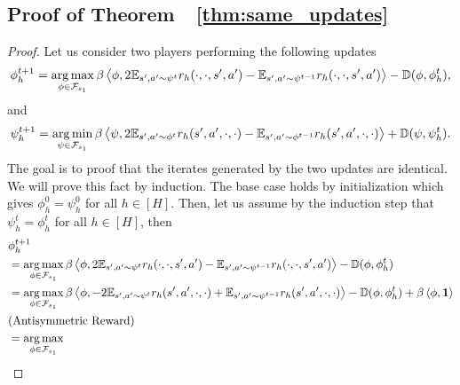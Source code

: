 \subsection{Proof of Theorem~~\ref{thm:same_updates}}
\label{proof:same_updates}
\begin{proof}
Let us consider two players performing the following updates
\begin{align*}
            \phi_h^{t+1} = \operatorname*{arg\,max}_{\phi \in \mathcal{F}_{s_1}} 
            \beta \left\langle{\phi},{
            2 \mathbb{E}_{s',a' \sim \psi^t}r_h(\cdot,\cdot,s',a') - \mathbb{E}_{s',a' \sim \psi^{t-1}}r_h(\cdot,\cdot,s',a')}\right\rangle - \mathbb{D}(\phi, \phi_h^t),
        \end{align*}
        and
        \begin{align*}
            \psi_h^{t+1} = \operatorname*{arg\,min}_{\psi \in \mathcal{F}_{s_1}} 
            \beta \left\langle{\psi},{
            2 \mathbb{E}_{s',a' \sim \phi^t}r_h(s',a',\cdot,\cdot) - \mathbb{E}_{s',a' \sim \phi^{t-1}}r_h(s',a',\cdot,\cdot)}\right\rangle + \mathbb{D}(\psi, \psi_h^t).
        \end{align*}
        The goal is to proof that the iterates generated by the two updates are identical. We will prove this fact by induction. The base case holds by initialization which gives $\phi_h^0=\psi^0_h$ for all $h \in [H]$.
        Then, let us assume by the induction step that $\psi^t_h = \phi^t_h$ for all $h \in [H]$, then 
        \begin{align*}
           & \phi_h^{t+1} \\&= \argmax_{\phi \in \mathcal{F}_{s_1}} 
            \beta \innerprod{\phi}{
            2 \mathbb{E}_{s',a' \sim \psi^t}r_h(\cdot,\cdot,s',a') - \mathbb{E}_{s',a' \sim \psi^{t-1}}r_h(\cdot,\cdot, s',a')} - \mathbb{D}(\phi, \phi_h^t) \\
            &= \argmax_{\phi \in \mathcal{F}_{s_1}} 
            \beta \innerprod{\phi}{
            - 2 \mathbb{E}_{s',a' \sim \psi^t}r_h(s',a',\cdot,\cdot) + \mathbb{E}_{s',a' \sim \psi^{t-1}}r_h(s',a',\cdot,\cdot)} - \mathbb{D}(\phi, \phi_h^t) + \beta \innerprod{\phi}{\mathbf{1}}\\&\text{(Antisymmetric Reward)}\\
            &= \argmax_{\phi \in \mathcal{F}_{s_1}} 

\end{align*}
\end{proof}

